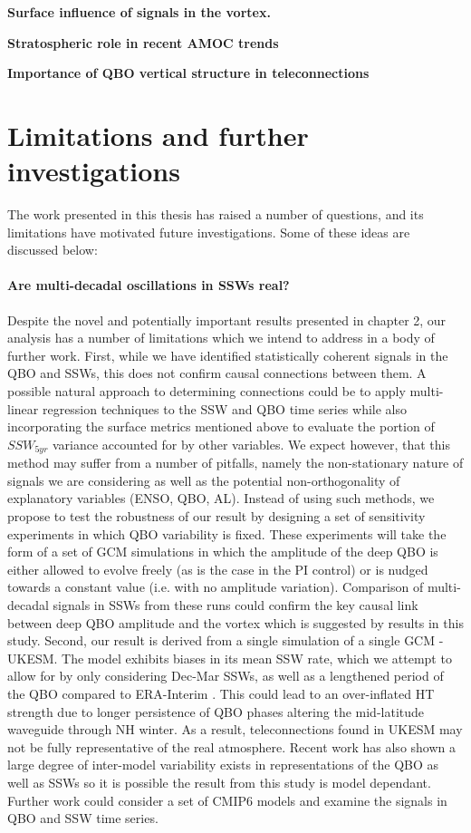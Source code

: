 \textbf{Surface influence of signals in the vortex.}

\textbf{Stratospheric role in recent AMOC trends}

\textbf{Importance of QBO vertical structure in teleconnections}

\section{Limitations and further investigations}

The work presented in this thesis has raised a number of questions, and its
limitations have motivated future investigations. Some of these ideas are
discussed below:

\paragraph{Are multi-decadal oscillations in SSWs real?} 

Despite the novel and potentially important results presented in chapter 2, our analysis has a number of limitations which we intend to address in a body of further work. First, while we have identified statistically coherent signals in the QBO and SSWs, this does not confirm causal connections between them. A possible natural approach to determining connections could be to apply multi-linear regression techniques to the SSW and QBO time series while also incorporating the surface metrics mentioned above to evaluate the portion of $SSW_{5yr}$ variance accounted for by other variables. We expect however, that this method may suffer from a number of pitfalls, namely the non-stationary nature of signals we are considering as well as the potential non-orthogonality of explanatory variables (ENSO, QBO, AL). Instead of using such methods, we propose to test the robustness of our result by designing a set of sensitivity experiments in which QBO variability is fixed. These experiments will take the form of a set of GCM simulations in which the amplitude of the deep QBO is either allowed to evolve freely (as is the case in the PI control) or is nudged towards a constant value (i.e. with no amplitude variation). Comparison of multi-decadal signals in SSWs from these runs could confirm the key causal link between deep QBO amplitude and the vortex which is suggested by results in this study. Second, our result is derived from a single simulation of a single GCM - UKESM. The model exhibits biases in its mean SSW rate, which we attempt to allow for by only considering Dec-Mar SSWs, as well as a lengthened period of the QBO compared to ERA-Interim \citep{Bushell2020}. This could lead to an over-inflated HT strength due to longer persistence of QBO phases altering the mid-latitude waveguide through NH winter. As a result, teleconnections found in UKESM may not be fully representative of the real atmosphere. Recent work has also shown a large degree of inter-model variability exists in representations of the QBO as well as SSWs \citep{Bushell2020,ayarzag2020} so it is possible the result from this study is model dependant. Further work could consider a set of CMIP6 models and examine the signals in QBO and SSW time series. 

